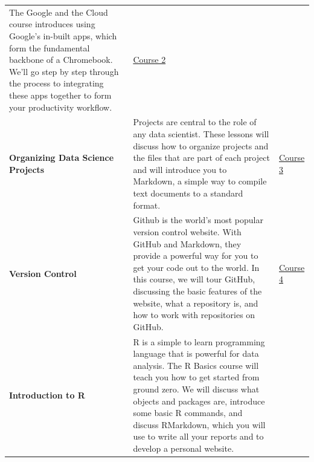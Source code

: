 \documentclass[]{book}
\begin{document}
\begin{longtable}[]{@{}lll@{}}
\begin{minipage}[t]{0.54\columnwidth}
The Google and the Cloud course introduces using Google's in-built apps, which form the fundamental backbone of a Chromebook. We'll go step by step through the process to integrating these apps together to form your productivity workflow.\strut
\end{minipage} & \begin{minipage}[t]{0.12\columnwidth}\raggedright
\href{https://leanpub.com/universities/courses/jhu/cbds-google}{Course 2}\strut
\end{minipage}\tabularnewline
\begin{minipage}[t]{0.26\columnwidth}\raggedright
\textbf{Organizing Data Science Projects}\strut
\end{minipage} & \begin{minipage}[t]{0.54\columnwidth}\raggedright
Projects are central to the role of any data scientist. These lessons will discuss how to organize projects and the files that are part of each project and will introduce you to Markdown, a simple way to compile text documents to a standard format.\strut
\end{minipage} & \begin{minipage}[t]{0.12\columnwidth}\raggedright
\href{https://leanpub.com/universities/courses/jhu/cbds-organizing}{Course 3}\strut
\end{minipage}\tabularnewline
\begin{minipage}[t]{0.26\columnwidth}\raggedright
\textbf{Version Control}\strut
\end{minipage} & \begin{minipage}[t]{0.54\columnwidth}\raggedright
Github is the world's most popular version control website. With GitHub and Markdown, they provide a powerful way for you to get your code out to the world. In this course, we will tour GitHub, discussing the basic features of the website, what a repository is, and how to work with repositories on GitHub.\strut
\end{minipage} & \begin{minipage}[t]{0.12\columnwidth}\raggedright
\href{https://leanpub.com/universities/courses/jhu/cbds-version-control}{Course 4}\strut
\end{minipage}\tabularnewline
\begin{minipage}[t]{0.26\columnwidth}\raggedright
\textbf{Introduction to R}\strut
\end{minipage} & \begin{minipage}[t]{0.54\columnwidth}\raggedright
R is a simple to learn programming language that is powerful for data analysis. The R Basics course will teach you how to get started from ground zero. We will discuss what objects and packages are, introduce some basic R commands, and discuss RMarkdown, which you will use to write all your reports and to develop a personal website.\strut

\end{minipage}
\end{longtable}
\end{document}
